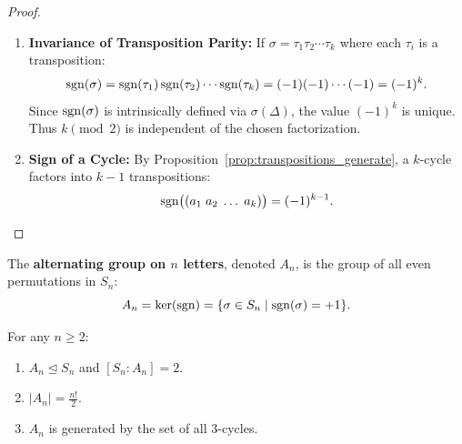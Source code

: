 \begin{proof}
\begin{enumerate}[label=\textbf{(\roman*)}, leftmargin=*, itemsep=8pt]
    \item \textbf{Invariance of Transposition Parity:}
    If $\sigma = \tau_1 \tau_2 \cdots \tau_k$ where each $\tau_i$ is a transposition:
    \begin{equation*}
    \operatorname{sgn}(\sigma) = \operatorname{sgn}(\tau_1)\operatorname{sgn}(\tau_2)\cdots\operatorname{sgn}(\tau_k) = (-1)(-1)\cdots(-1) = (-1)^k.
    \end{equation*}
    Since $\operatorname{sgn}(\sigma)$ is intrinsically defined via $\sigma(\Delta)$, the value $(-1)^k$ is unique. Thus $k \pmod 2$ is independent of the chosen factorization.

    \item \textbf{Sign of a Cycle:}
    By Proposition~\ref{prop:transpositions_generate}, a $k$-cycle factors into $k-1$ transpositions:
    \begin{equation*}
    \operatorname{sgn}\bigl((a_1 \; a_2 \; \dots \; a_k)\bigr) = (-1)^{k-1}.
    \end{equation*}
\end{enumerate}
\end{proof}

\begin{definition}
The \textbf{alternating group on $n$ letters}, denoted $A_n$, is the group of all even permutations in $S_n$:
\begin{equation}
A_n = \ker(\operatorname{sgn}) = \{ \sigma \in S_n \mid \operatorname{sgn}(\sigma) = +1 \}.
\end{equation}
\end{definition}

\begin{proposition}
\label{prop:an_props}
For any $n \ge 2$:
\begin{enumerate}[label=\textbf{(\roman*)}, leftmargin=*, itemsep=4pt]
    \item $A_n \trianglelefteq S_n$ and $[S_n : A_n] = 2$.
    \item $|A_n| = \frac{n!}{2}$.
    \item $A_n$ is generated by the set of all $3$-cycles.
\end{enumerate}
\end{proposition}


